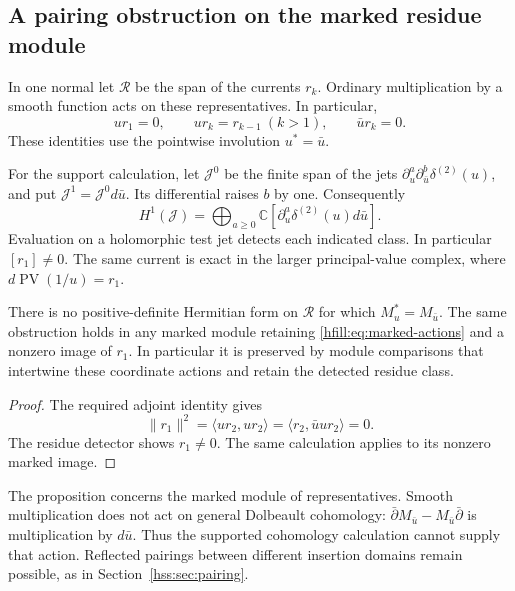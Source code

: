 \subsection{A pairing obstruction on the marked residue module}

In one normal let $\mathcal R$ be the span of the currents $r_k$.
Ordinary multiplication by a smooth function acts on these representatives.
In particular,
\begin{equation}\label{hfill:eq:marked-actions}
 u r_1=0,\qquad u r_k=r_{k-1}\ (k>1),
 \qquad \bar u r_k=0.
\end{equation}
These identities use the pointwise involution $u^*=\bar u$.

For the support calculation, let $\mathcal J^0$ be the finite span
of the jets $\partial_u^a\partial_{\bar u}^b\delta^{(2)}(u)$,
and put $\mathcal J^1=\mathcal J^0d\bar u$.
Its differential raises $b$ by one.
Consequently
\[
 H^1(\mathcal J)=
 \bigoplus_{a\geq0}\mathbb C
 [\partial_u^a\delta^{(2)}(u)d\bar u].
\]
Evaluation on a holomorphic test jet detects each indicated class.
In particular $[r_1]\ne0$.
The same current is exact in the larger principal-value complex,
where $d\operatorname{PV}(1/u)=r_1$.

\begin{proposition}\label{hfill:prop:positive-obstruction}
There is no positive-definite Hermitian form on $\mathcal R$
for which $M_u^*=M_{\bar u}$.
The same obstruction holds in any marked module retaining
\eqref{hfill:eq:marked-actions} and a nonzero image of $r_1$.
In particular it is preserved by module comparisons that intertwine
these coordinate actions and retain the detected residue class.
\end{proposition}

\begin{proof}
The required adjoint identity gives
\[
 \|r_1\|^2=\langle ur_2,ur_2\rangle
 =\langle r_2,\bar u u r_2\rangle=0.
\]
The residue detector shows $r_1\ne0$.
The same calculation applies to its nonzero marked image.
\end{proof}

The proposition concerns the marked module of representatives.
Smooth multiplication does not act on general Dolbeault cohomology:
$\bar\partial M_{\bar u}-M_{\bar u}\bar\partial$
is multiplication by $d\bar u$.
Thus the supported cohomology calculation cannot supply that action.
Reflected pairings between different insertion domains remain possible,
as in Section~\ref{hss:sec:pairing}.

